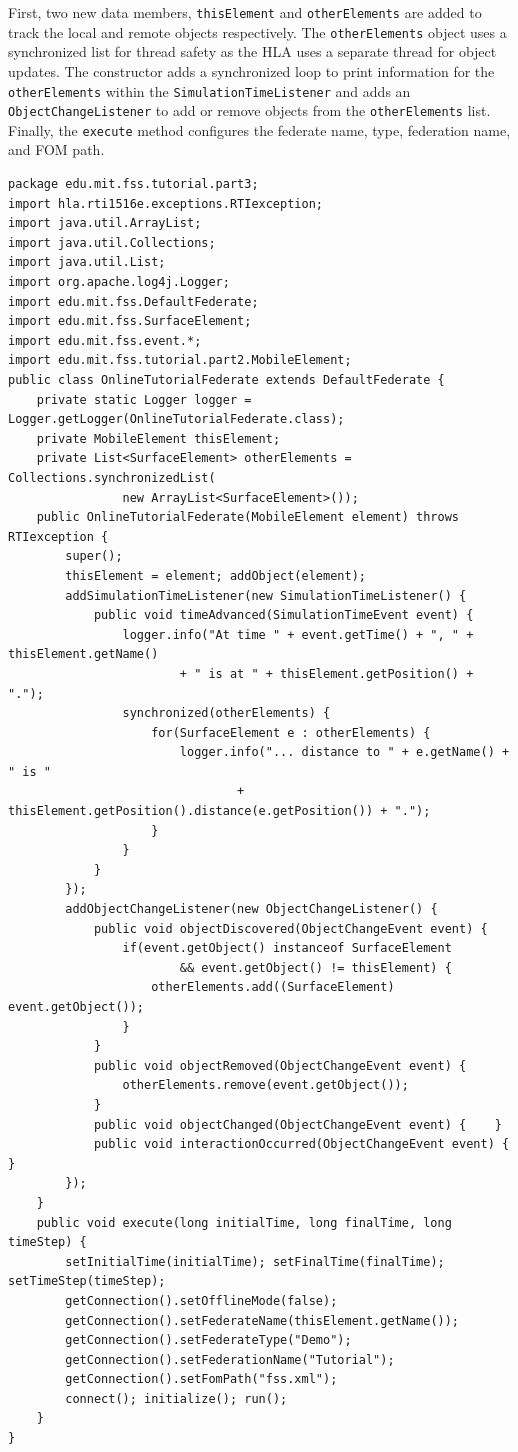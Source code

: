 \documentclass[]{article}
\begin{document}
First, two new data members, \texttt{thisElement} and \texttt{otherElements} are added to track the local and remote objects respectively. The \texttt{otherElements} object uses a synchronized list for thread safety as the HLA uses a separate thread for object updates. The constructor adds a synchronized loop to print information for the \texttt{otherElements} within the \texttt{SimulationTimeListener} and adds an \texttt{ObjectChangeListener} to add or remove objects from the \texttt{otherElements} list. Finally, the \texttt{execute} method configures the federate name, type, federation name, and FOM path.

\begin{Code}
\begin{lstlisting}[caption={OnlineTutorialFederate object class},label={lst:onlineTutorialFederate}]
package edu.mit.fss.tutorial.part3;
import hla.rti1516e.exceptions.RTIexception;
import java.util.ArrayList;
import java.util.Collections;
import java.util.List;
import org.apache.log4j.Logger;
import edu.mit.fss.DefaultFederate;
import edu.mit.fss.SurfaceElement;
import edu.mit.fss.event.*;
import edu.mit.fss.tutorial.part2.MobileElement;
public class OnlineTutorialFederate extends DefaultFederate {
	private static Logger logger = Logger.getLogger(OnlineTutorialFederate.class);
	private MobileElement thisElement;
	private List<SurfaceElement> otherElements = Collections.synchronizedList(
				new ArrayList<SurfaceElement>());
	public OnlineTutorialFederate(MobileElement element) throws RTIexception {
		super();
		thisElement = element; addObject(element);
		addSimulationTimeListener(new SimulationTimeListener() {
			public void timeAdvanced(SimulationTimeEvent event) {
				logger.info("At time " + event.getTime() + ", " + thisElement.getName() 
						+ " is at " + thisElement.getPosition() + ".");
				synchronized(otherElements) {
					for(SurfaceElement e : otherElements) {
						logger.info("... distance to " + e.getName() + " is " 
								+ thisElement.getPosition().distance(e.getPosition()) + ".");
					}
				}
			}
		});
		addObjectChangeListener(new ObjectChangeListener() {
			public void objectDiscovered(ObjectChangeEvent event) {
				if(event.getObject() instanceof SurfaceElement
						&& event.getObject() != thisElement) {
					otherElements.add((SurfaceElement) event.getObject());
				}
			}
			public void objectRemoved(ObjectChangeEvent event) { 
				otherElements.remove(event.getObject());
			}
			public void objectChanged(ObjectChangeEvent event) { 	}
			public void interactionOccurred(ObjectChangeEvent event) { 	}
		});
	}
	public void execute(long initialTime, long finalTime, long timeStep) {
		setInitialTime(initialTime); setFinalTime(finalTime); setTimeStep(timeStep);
		getConnection().setOfflineMode(false);
		getConnection().setFederateName(thisElement.getName());
		getConnection().setFederateType("Demo");
		getConnection().setFederationName("Tutorial");
		getConnection().setFomPath("fss.xml");
		connect(); initialize(); run();
	}
}
\end{lstlisting}
\end{Code}
\end{document}
